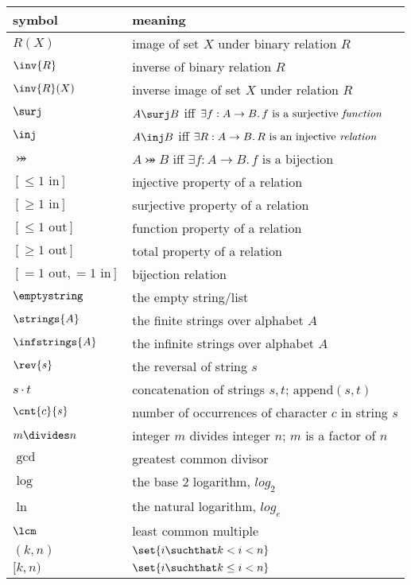 \begin{center}
\begin{tabular}{ll}
symbol         &  meaning\\
\hline
$R(X)$         & image of set $X$ under binary relation $R$\\
$\inv{R}$      & inverse of binary relation $R$\\
$\inv{R}(X)$   & inverse image of set $X$ under relation $R$\\
$\surj$        & $A \surj B$ iff $\exists f:A \to B.\, f\text{ is a
  surjective \emph{function}}$\\
$\inj$         & $A \inj B$ iff $\exists R:A \to B.\, R\text{ is an
  injective \emph{relation}}$\\
$\bij$         & $A \bij B$ iff $\exists f:A \to B.\, f\text{ is a
  bijection}$\\
$[\leq 1\text{ in}]$  & injective property of a relation\\
$[\geq 1\text{ in}]$  & surjective property of a relation\\
$[\leq 1\text{ out}]$  & function property of a relation\\
$[\geq 1\text{ out}]$  & total property of a relation\\
$[= 1\text{ out}, = 1\text{ in}]$  & bijection relation\\
$\emptystring$ & the empty string/list\\
$\strings{A}$  & the finite strings over alphabet $A$\\
$\infstrings{A}$ & the infinite strings over alphabet $A$\\
$\rev{s}$      & the reversal of string $s$\\
$s \cdot t$    & concatenation of strings $s,t$; $\text{append}(s,t)$\\
$\cnt{c}{s}$   & number of occurrences of character $c$ in string $s$\\
$m \divides n$ & integer $m$ divides integer $n$; $m$ is a factor of $n$\\
$\gcd$         & greatest common divisor\\
$\log$         & the base 2 logarithm, $log_2$\\
$\ln$          & the natural logarithm, $log_e$\\
$\lcm$         & least common multiple\\
$(k, n)$       & $\set{i \suchthat k < i < n}$\\
$[k, n)$       & $\set{i \suchthat k \le i < n}$\\

\end{tabular}
\end{center}
